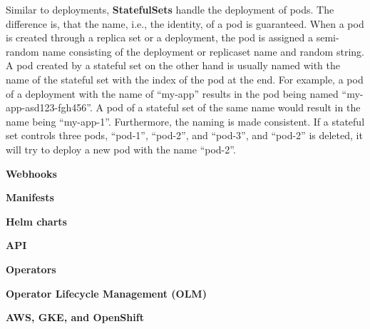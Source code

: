 Similar to deployments, \textbf{StatefulSets}\cite{kubernetes-statefulsets} handle the deployment of pods.
The difference is, that the name, i.e., the identity, of a pod is guaranteed.
When a pod is created through a replica set or a deployment, the pod is assigned a semi-random name consisting of the deployment or replicaset name and random string.
A pod created by a stateful set on the other hand is usually named with the name of the stateful set with the index of the pod at the end.
For example, a pod of a deployment with the name of ``my-app'' results in the pod being named ``my-app-asd123-fgh456''.
A pod of a stateful set of the same name would result in the name being ``my-app-1''.
Furthermore, the naming is made consistent.
If a stateful set controls three pods, ``pod-1'', ``pod-2'', and ``pod-3'', and ``pod-2'' is deleted, it will try to deploy a new pod with the name ``pod-2''.

\textbf{Webhooks}

\textbf{Manifests}

\textbf{Helm charts}

\textbf{API}

\textbf{Operators}

\textbf{Operator Lifecycle Management (OLM)}

\textbf{AWS, GKE, and OpenShift}